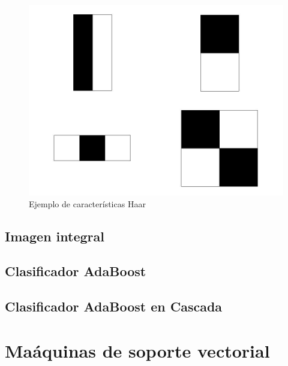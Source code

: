 \begin{figure}[!h]
\begin{center}
\includegraphics[scale=.3]{./Figures/haarFeatures.jpg}
\end{center}
\caption{Ejemplo de características Haar}
\label{fig:haarFeatures}
\end{figure} 


\subsection{Imagen integral}\label{subsec:IntegralImage} 

\subsection{Clasificador AdaBoost}\label{subsec:AdaboostClasifier}  

\subsection{Clasificador AdaBoost en Cascada}\label{subsec:AdaboostCascade}  

\section{Ma\'aquinas de soporte vectorial}\label{sec:SVM}

\newpage
